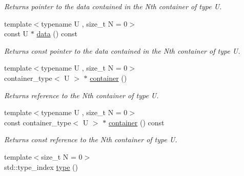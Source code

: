 \begin{DoxyCompactItemize}
\begin{DoxyCompactList}\small\item\em Returns pointer to the data contained in the Nth container of type U. \end{DoxyCompactList}\item 
\hypertarget{classheterogeneous_1_1heterovector_3_01_t_00_01_types_8_8_8_4_ac4cf19c4002a50f2122bca0ff5f0a821}{}{\footnotesize template$<$typename U , size\+\_\+t N = 0$>$ }\\const U $\ast$ \hyperlink{classheterogeneous_1_1heterovector_3_01_t_00_01_types_8_8_8_4_ac4cf19c4002a50f2122bca0ff5f0a821}{data} () const \label{classheterogeneous_1_1heterovector_3_01_t_00_01_types_8_8_8_4_ac4cf19c4002a50f2122bca0ff5f0a821}

\begin{DoxyCompactList}\small\item\em Returns const pointer to the data contained in the Nth container of type U. \end{DoxyCompactList}\item 
\hypertarget{classheterogeneous_1_1heterovector_3_01_t_00_01_types_8_8_8_4_a62bcae09d4ca0d66dc59a4e29b0e2c37}{}{\footnotesize template$<$typename U , size\+\_\+t N = 0$>$ }\\container\+\_\+type$<$ U $>$ $\ast$ \hyperlink{classheterogeneous_1_1heterovector_3_01_t_00_01_types_8_8_8_4_a62bcae09d4ca0d66dc59a4e29b0e2c37}{container} ()\label{classheterogeneous_1_1heterovector_3_01_t_00_01_types_8_8_8_4_a62bcae09d4ca0d66dc59a4e29b0e2c37}

\begin{DoxyCompactList}\small\item\em Returns reference to the Nth container of type U. \end{DoxyCompactList}\item 
\hypertarget{classheterogeneous_1_1heterovector_3_01_t_00_01_types_8_8_8_4_ad3568e30a13341df67f0e21c6547a1ba}{}{\footnotesize template$<$typename U , size\+\_\+t N = 0$>$ }\\const container\+\_\+type$<$ U $>$ $\ast$ \hyperlink{classheterogeneous_1_1heterovector_3_01_t_00_01_types_8_8_8_4_ad3568e30a13341df67f0e21c6547a1ba}{container} () const \label{classheterogeneous_1_1heterovector_3_01_t_00_01_types_8_8_8_4_ad3568e30a13341df67f0e21c6547a1ba}

\begin{DoxyCompactList}\small\item\em Returns const reference to the Nth container of type U. \end{DoxyCompactList}\item 
\hypertarget{classheterogeneous_1_1heterovector_3_01_t_00_01_types_8_8_8_4_a6b2fcabd7d4725d4ab5f0b2a194ead11}{}{\footnotesize template$<$size\+\_\+t N = 0$>$ }\\std\+::type\+\_\+index \hyperlink{classheterogeneous_1_1heterovector_3_01_t_00_01_types_8_8_8_4_a6b2fcabd7d4725d4ab5f0b2a194ead11}{type} ()\label{classheterogeneous_1_1heterovector_3_01_t_00_01_types_8_8_8_4_a6b2fcabd7d4725d4ab5f0b2a194ead11}


\end{DoxyCompactItemize}
